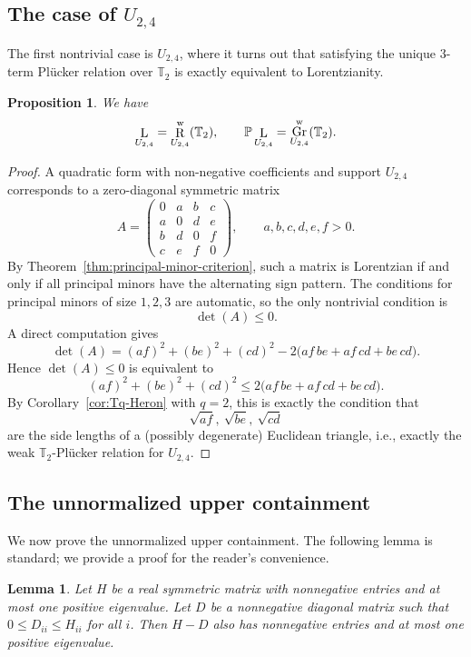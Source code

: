\documentclass[12pt]{amsart}
\newtheorem{lemma}[theorem]{Lemma}
\newtheorem{proposition}[theorem]{Proposition}
\theoremstyle{definition}
\newcommand{\1}{\mathbf{1}}
\DeclareMathOperator{\upL}{L}   %
\DeclareMathOperator{\upR}{R}   %
\DeclareMathOperator{\Gr}{Gr}
\renewcommand\P{{\mathbb P}}
\newcommand\T{{\mathbb T}}
\begin{document}
\subsection{The case of $U_{2,4}$}

The first nontrivial case is $U_{2,4}$, where it turns out that satisfying the unique $3$-term Pl\"ucker relation over $\T_2$ is
exactly equivalent to Lorentzianity.

\begin{proposition}
\label{prop:U24}
We have
\[
\upL_{U_{2,4}} = \upR_{U_{2,4}}^{\rm w}(\T_2),
\qquad
\P\upL_{U_{2,4}} = \Gr_{U_{2,4}}^{\rm w}(\T_2).
\]
\end{proposition}

\begin{proof}
A quadratic form with non-negative coefficients and support $U_{2,4}$ corresponds to a zero-diagonal
symmetric matrix
\[
A=
\begin{pmatrix}
0 & a & b & c\\
a & 0 & d & e\\
b & d & 0 & f\\
c & e & f & 0
\end{pmatrix},
\qquad a,b,c,d,e,f>0.
\]
By Theorem~\ref{thm:principal-minor-criterion}, such a matrix is Lorentzian if and only if
all principal minors have the alternating sign pattern. The conditions for principal minors
of size $1,2,3$ are automatic, so the only nontrivial condition is
\[
\det(A)\le 0.
\]
A direct computation gives
\[
\det(A)
=
(a f)^2 + (b e)^2 + (c d)^2
-2\bigl(a f\, b e + a f\, c d + b e\, c d\bigr).
\]
Hence $\det(A)\le 0$ is equivalent to
\[
(a f)^2 + (b e)^2 + (c d)^2
\le
2\bigl(a f\, b e + a f\, c d + b e\, c d\bigr).
\]
By Corollary~\ref{cor:Tq-Heron} with $q=2$, this is exactly the condition that
\[
\sqrt{af},\ \sqrt{be},\ \sqrt{cd}
\]
are the side lengths of a (possibly degenerate) Euclidean triangle, i.e., exactly the weak
$\T_2$-Pl\"ucker relation for $U_{2,4}$.
\end{proof}

\subsection{The unnormalized upper containment}

We now prove the unnormalized upper containment.
The following lemma is standard; we provide a proof for the reader's convenience.

\begin{lemma}
\label{lem:diagonal-deletion}
Let $H$ be a real symmetric matrix with nonnegative entries and at most one
positive eigenvalue.  Let $D$ be a nonnegative diagonal matrix such that
$0\le D_{ii}\le H_{ii}$ for all $i$.  Then $H-D$ also has nonnegative
entries and at most one positive eigenvalue.
\end{lemma}
\end{document}
